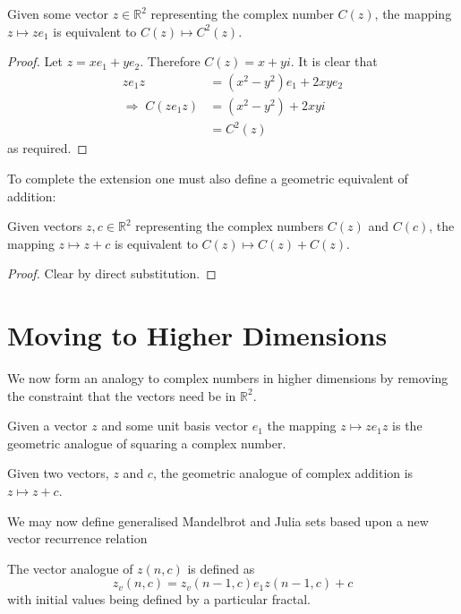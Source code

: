 \begin{lemma}
Given some vector $z \in \mathbb{R}^2$ representing the complex number
$C(z)$, the mapping $z \mapsto ze_1$ is equivalent to $C(z) \mapsto C^2(z)$.
\end{lemma}
\begin{proof}
Let $z = xe_1 + ye_2$. Therefore $C(z) = x + yi$. It is clear that
\begin{align*}
ze_1z &= (x^2 - y^2) e_1 + 2xye_2 \\
\Rightarrow\;C(ze_1z) &= (x^2 - y^2) + 2xyi\\
        &= C^2(z)
\end{align*}
as required.
\end{proof}

To complete the extension one must also define a geometric equivalent of
addition:
\begin{lemma}
Given vectors $z, c \in \mathbb{R}^2$ representing the complex numbers
$C(z)$ and $C(c)$, the mapping $z \mapsto z + c$ is equivalent to 
$C(z) \mapsto C(z) + C(z)$.
\end{lemma}
\begin{proof}
Clear by direct substitution.
\end{proof}

\section{Moving to Higher Dimensions}

We now form an analogy to complex numbers in higher dimensions
by removing the constraint that the vectors need be in $\mathbb{R}^2$.

\begin{definition}
Given a vector $z$ and some unit basis vector $e_1$ the mapping
$z \mapsto ze_1z$ is the geometric analogue of squaring a complex number.
\end{definition}

\begin{definition}
Given two vectors, $z$ and $c$, the geometric analogue of complex addition
is $z \mapsto z + c$.
\end{definition}

We may now define generalised Mandelbrot and Julia sets based upon
a new vector recurrence relation
\begin{definition}
The vector analogue of $z(n,c)$ is defined as
\[
z_v(n,c) = z_v(n-1,c) e_1 z(n-1,c) + c
\]
with initial values being defined by a particular fractal.
\end{definition}

